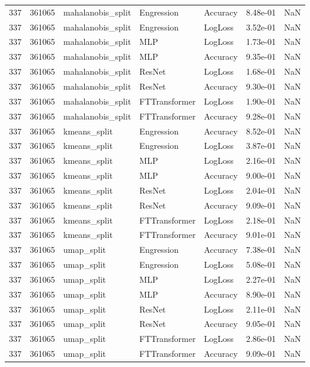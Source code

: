 \begin{tabular}{rrlllrr}
337 & 361065 & mahalanobis\_split & Engression & Accuracy & 8.48e-01 & NaN \\
337 & 361065 & mahalanobis\_split & Engression & LogLoss & 3.52e-01 & NaN \\
337 & 361065 & mahalanobis\_split & MLP & LogLoss & 1.73e-01 & NaN \\
337 & 361065 & mahalanobis\_split & MLP & Accuracy & 9.35e-01 & NaN \\
337 & 361065 & mahalanobis\_split & ResNet & LogLoss & 1.68e-01 & NaN \\
337 & 361065 & mahalanobis\_split & ResNet & Accuracy & 9.30e-01 & NaN \\
337 & 361065 & mahalanobis\_split & FTTransformer & LogLoss & 1.90e-01 & NaN \\
337 & 361065 & mahalanobis\_split & FTTransformer & Accuracy & 9.28e-01 & NaN \\
337 & 361065 & kmeans\_split & Engression & Accuracy & 8.52e-01 & NaN \\
337 & 361065 & kmeans\_split & Engression & LogLoss & 3.87e-01 & NaN \\
337 & 361065 & kmeans\_split & MLP & LogLoss & 2.16e-01 & NaN \\
337 & 361065 & kmeans\_split & MLP & Accuracy & 9.00e-01 & NaN \\
337 & 361065 & kmeans\_split & ResNet & LogLoss & 2.04e-01 & NaN \\
337 & 361065 & kmeans\_split & ResNet & Accuracy & 9.09e-01 & NaN \\
337 & 361065 & kmeans\_split & FTTransformer & LogLoss & 2.18e-01 & NaN \\
337 & 361065 & kmeans\_split & FTTransformer & Accuracy & 9.01e-01 & NaN \\
337 & 361065 & umap\_split & Engression & Accuracy & 7.38e-01 & NaN \\
337 & 361065 & umap\_split & Engression & LogLoss & 5.08e-01 & NaN \\
337 & 361065 & umap\_split & MLP & LogLoss & 2.27e-01 & NaN \\
337 & 361065 & umap\_split & MLP & Accuracy & 8.90e-01 & NaN \\
337 & 361065 & umap\_split & ResNet & LogLoss & 2.11e-01 & NaN \\
337 & 361065 & umap\_split & ResNet & Accuracy & 9.05e-01 & NaN \\
337 & 361065 & umap\_split & FTTransformer & LogLoss & 2.86e-01 & NaN \\
337 & 361065 & umap\_split & FTTransformer & Accuracy & 9.09e-01 & NaN \\

\end{tabular}

